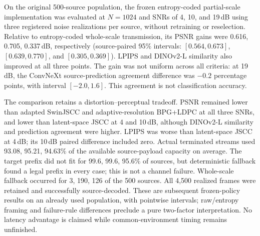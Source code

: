 On the original 500-source population, the frozen entropy-coded partial-scale
implementation was evaluated at $N=1024$ and SNRs of 4, 10, and 19\,dB using
three registered noise realizations per source, without retraining or
reselection. Relative to entropy-coded whole-scale transmission, its PSNR
gains were 0.616, 0.705, 0.337\,dB, respectively (source-paired 95\% intervals:
$[0.564,0.673]$, $[0.639,0.770]$, and $[0.305,0.369]$).
LPIPS and DINOv2-L similarity also improved at all three points. The gain was
not uniform across all criteria: at 19\,dB, the ConvNeXt source-prediction
agreement difference was $-0.2$ percentage points, with interval
$[-2.0,1.6]$. This agreement is not classification accuracy.

The comparison retains a distortion--perceptual tradeoff. PSNR remained lower
than adapted SwinJSCC and adaptive-resolution BPG+LDPC at all three SNRs,
and lower than latent-space JSCC at 4 and 10\,dB, although DINOv2-L similarity
and prediction agreement were higher. LPIPS was worse than latent-space JSCC
at 4\,dB; its 10\,dB paired difference included zero. Actual terminated streams
used 93.08, 95.21, 94.63\% of the available source-payload capacity on average. The target
prefix did not fit for 99.6, 99.6, 95.6\% of sources, but deterministic fallback
found a legal prefix in every case; this is not a channel failure. Whole-scale
fallback occurred for 3, 190, 126 of the 500 sources. All 4,500 realized
frames were retained and successfully source-decoded. These are subsequent
frozen-policy results on an already used population, with pointwise intervals;
raw/entropy framing and failure-rule differences preclude a pure two-factor
interpretation. No latency advantage is claimed while common-environment
timing remains unfinished.
